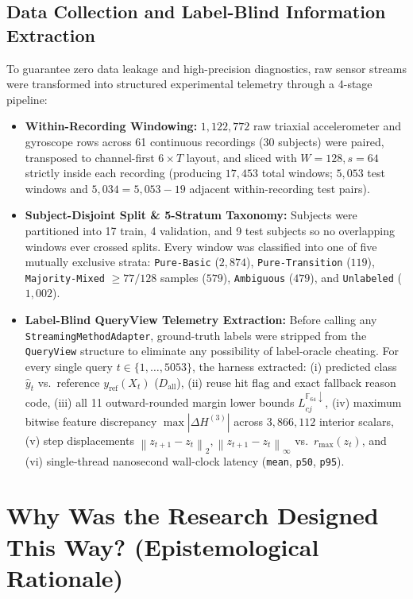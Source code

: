 \documentclass[11pt,a4paper]{article}
\newcommand{\F}{\mathbb{F}}
\newcommand{\norm}[1]{\left\lVert #1\right\rVert}
\newcommand{\abs}[1]{\left\lvert #1\right\rvert}
\newcommand{\code}[1]{{\small\ttfamily\nolinkurl{#1}}}
\begin{document}
\subsection{Data Collection and Label-Blind Information Extraction}
To guarantee zero data leakage and high-precision diagnostics, raw sensor streams were transformed into structured experimental telemetry through a 4-stage pipeline:
\begin{itemize}
  \item \textbf{Within-Recording Windowing:} $1,122,772$ raw triaxial accelerometer and gyroscope rows across 61 continuous recordings (30 subjects) were paired, transposed to channel-first $6 \times T$ layout, and sliced with $W=128, s=64$ strictly inside each recording (producing $17,453$ total windows; $5,053$ test windows and $5,034 = 5,053 - 19$ adjacent within-recording test pairs).
  \item \textbf{Subject-Disjoint Split \& 5-Stratum Taxonomy:} Subjects were partitioned into 17 train, 4 validation, and 9 test subjects so no overlapping windows ever crossed splits. Every window was classified into one of five mutually exclusive strata: \code{Pure-Basic} ($2,874$), \code{Pure-Transition} ($119$), \code{Majority-Mixed} $\ge 77/128$ samples ($579$), \code{Ambiguous} ($479$), and \code{Unlabeled} ($1,002$).
  \item \textbf{Label-Blind QueryView Telemetry Extraction:} Before calling any \code{StreamingMethodAdapter}, ground-truth labels were stripped from the \code{QueryView} structure to eliminate any possibility of label-oracle cheating. For every single query $t \in \{1,\dots,5053\}$, the harness extracted:
    (i) predicted class $\hat{y}_t$ vs.\ reference $y_{\text{ref}}(X_t)$ ($D_{\text{all}}$),
    (ii) reuse hit flag and exact fallback reason code,
    (iii) all 11 outward-rounded margin lower bounds $L_{cj}^{\F_{64}\downarrow}$,
    (iv) maximum bitwise feature discrepancy $\max \abs{\Delta H^{(3)}}$ across $3,866,112$ interior scalars,
    (v) step displacements $\norm{z_{t+1} - z_t}_2, \norm{z_{t+1} - z_t}_\infty$ vs.\ $r_{\max}(z_t)$, and
    (vi) single-thread nanosecond wall-clock latency (\code{mean}, \code{p50}, \code{p95}).
\end{itemize}

\section{Why Was the Research Designed This Way? (Epistemological Rationale)}
\end{document}
